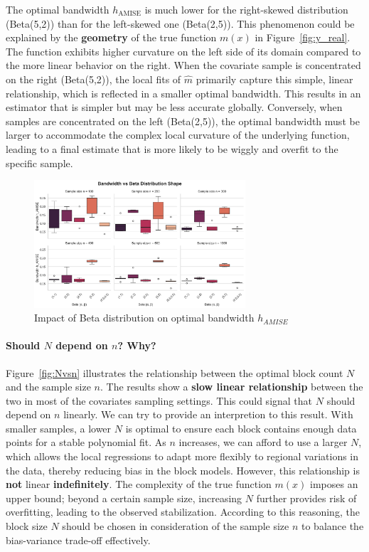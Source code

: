 \documentclass{article}
\begin{document}
The optimal bandwidth \( h_{\text{AMISE}} \) is much lower for the right-skewed distribution (Beta(5,2)) than for the left-skewed one (Beta(2,5)). 
This phenomenon could be explained by the \textbf{geometry} of the true function \( m(x) \) in Figure~\ref{fig:y_real}. The function exhibits higher curvature on the left side of its domain compared to the more linear behavior on the right.
When the covariate sample is concentrated on the right (Beta(5,2)), the local fits of \( \hat{m} \) primarily capture this simple, linear relationship, which is reflected in a smaller optimal bandwidth. This results in an estimator 
that is simpler but may be less accurate globally. Conversely, when samples are concentrated on the left (Beta(2,5)), the optimal bandwidth must be larger to accommodate the complex local curvature of the underlying function, leading 
to a final estimate that is more likely to be wiggly and overfit to the specific sample.

\begin{figure}[H]
\centering
\includegraphics[width=0.70\textwidth]{plot3_beta_vs_bandwidth.png}
\caption{Impact of Beta distribution on optimal bandwidth $h_{AMISE}$}
\label{fig:beta}
\end{figure}




\paragraph{Should $N$ depend on $n$? Why?}
Figure~\ref{fig:Nvsn} illustrates the relationship between the optimal block count $N$ and the sample size $n$. 
The results show a \textbf{slow linear relationship} between the two in most of the covariates sampling settings.
This could signal that $N$ should depend on $n$ linearly. 
We can try to provide an interpretion to this result. With smaller samples, a lower $N$ is optimal to ensure each 
block contains enough data points for a stable polynomial fit. As $n$ increases, we can afford to use a larger $N$, which allows the local regressions to adapt more flexibly to regional variations in the data, thereby reducing bias in the block models. 
However, this relationship is \textbf{not} linear \textbf{indefinitely}. The complexity of the true function $m(x)$ imposes an upper bound; beyond a certain sample size, increasing $N$ further provides risk of overfitting, 
leading to the observed stabilization. According to this reasoning, the block size $N$ should be chosen in consideration of the sample size $n$ to balance the bias-variance trade-off effectively.
\end{document}
